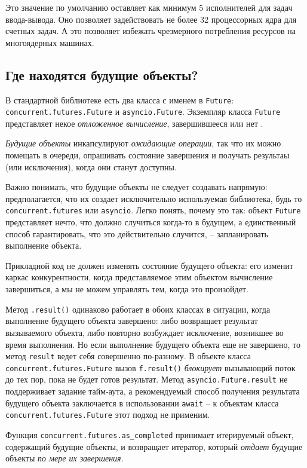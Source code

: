 \documentclass[%
	11pt,
	a4paper,
	utf8,
		]{article}
\begin{document}
Это значение по умолчанию оставляет как минимум 5 исполнителей для задач ввода-вывода. Оно позволяет задействовать не более 32 процессорных ядра для счетных задач. А это позволяет избежать чрезмерного потребления ресурсов на многоядерных машинах.

\subsection{Где находятся будущие объекты?}

В стандартной библиотеке есть два класса с именем в \verb*|Future|: \verb|concurrent.futures.Future| и \verb*|asyncio.Future|. Экземпляр класса \verb|Future| представляет некое \emph{отложенное вычисление}, завершившееся или нет \cite[]{ramalho:python-2022}.

\emph{Будущие объекты} инкапсулируют \emph{ожидающие операции}, так что их можно помещать в очереди, опрашивать состояние завершения и получать результаы (или исключения), когда они станут доступны.

Важно понимать, что будущие объекты не следует создавать напрямую: предполагается, что их создает исключительно используемая библиотека, будь то \verb*|concurrent.futures| или \verb|asyncio|. Легко понять, почему это так: объект \verb*|Future| представляет нечто, что должно случиться когда-то в будущем, а единственный способ гарантировать, что это действительно случится, -- запланировать выполнение объекта. 

Прикладной код не должен изменять состояние будущего объекта: его изменит каркас конкурентности, когда представляемое этим объектом вычисление завершиться, а мы не можем управлять тем, когда это произойдет.

Метод \verb|.result()| одинаково работает в обоих классах в ситуации, когда выполнение будущего объекта завершено: либо возвращает результат вызываемого объекта, либо повторно возбуждает исключение, возникшее во время выполнения. Но если выполнение будущего объекта еще не завершено, то метод \verb*|result| ведет себя совершенно по-разному. В объекте класса \verb|concurrent.futures.Future| вызов \verb*|f.result()| \emph{блокирует} вызывающий поток до тех пор, пока не будет готов результат. Метод \verb|asyncio.Future.result| не поддерживает задание тайм-аута, а рекомендуемый способ получения результата будущего объекта заключается в использовании \verb*|await| -- к объектам класса \verb|concurrent.futures.Future| этот подход не применим.

Функция \verb*|concurrent.futures.as_completed| принимает итерируемый объект, содержащий будущие объекты, и возвращает итератор, который \emph{отдает} будущие объекты \emph{по мере их завершения}.
\end{document}
